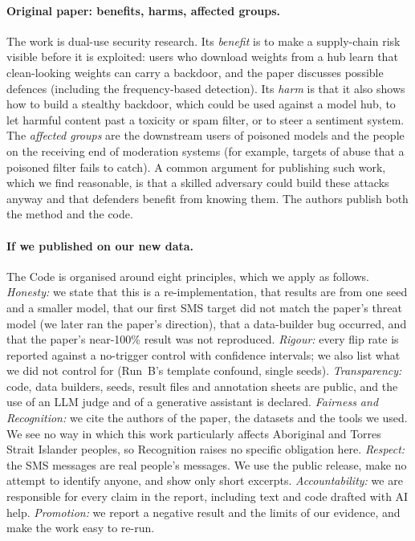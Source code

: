 \documentclass[11pt]{article}
\begin{document}
\paragraph{Original paper: benefits, harms, affected groups.}
The work is dual-use security research. Its \emph{benefit} is to make a supply-chain risk visible before it is exploited: users who download weights from a hub learn that clean-looking weights can carry a backdoor, and the paper discusses possible defences (including the frequency-based detection). Its \emph{harm} is that it also shows how to build a stealthy backdoor, which could be used against a model hub, to let harmful content past a toxicity or spam filter, or to steer a sentiment system. The \emph{affected groups} are the downstream users of poisoned models and the people on the receiving end of moderation systems (for example, targets of abuse that a poisoned filter fails to catch). A common argument for publishing such work, which we find reasonable, is that a skilled adversary could build these attacks anyway and that defenders benefit from knowing them. The authors publish both the method and the code.

\paragraph{If we published on our new data.}
The Code \citep{nhmrc2018} is organised around eight principles, which we apply as follows.
\emph{Honesty:} we state that this is a re-implementation, that results are from one seed and a smaller model, that our first SMS target did not match the paper's threat model (we later ran the paper's direction), that a data-builder bug occurred, and that the paper's near-100\% result was not reproduced.
\emph{Rigour:} every flip rate is reported against a no-trigger control with confidence intervals; we also list what we did not control for (Run~B's template confound, single seeds).
\emph{Transparency:} code, data builders, seeds, result files and annotation sheets are public, and the use of an LLM judge and of a generative assistant is declared.
\emph{Fairness and Recognition:} we cite the authors of the paper, the datasets and the tools we used. We see no way in which this work particularly affects Aboriginal and Torres Strait Islander peoples, so Recognition raises no specific obligation here.
\emph{Respect:} the SMS messages are real people's messages. We use the public release, make no attempt to identify anyone, and show only short excerpts.
\emph{Accountability:} we are responsible for every claim in the report, including text and code drafted with AI help.
\emph{Promotion:} we report a negative result and the limits of our evidence, and make the work easy to re-run.
\end{document}
